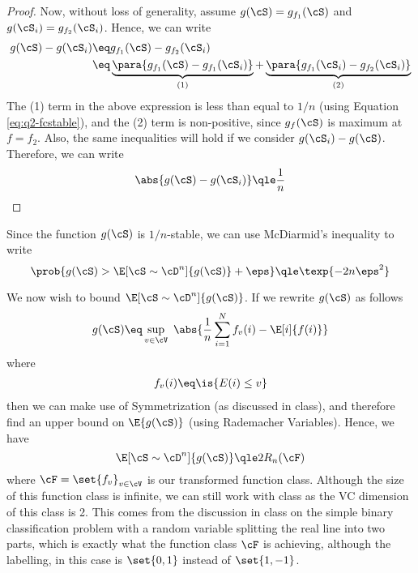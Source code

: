 \documentclass[a4paper,10pt]{article}
\begin{document}
\begin{question}
\begin{claim}
\begin{proof}
			Now, without loss of generality, assume $g(\cS) = g_{f_1}(\cS)$ and $g(\cS_i) = g_{f_2}(\cS_i)$. Hence, we can write
			\begin{align*}
				g(\cS) - g(\cS_i)	&\eq	g_{f_1}(\cS) - g_{f_2}(\cS_i) \\
				&\eq	\underbrace{\para{g_{f_1}(\cS) - g_{f_1}(\cS_i)}}_{(1)} + \underbrace{\para{g_{f_1}(\cS_i) - g_{f_2}(\cS_i)}}_{(2)}
			\end{align*}
			The (1) term in the above expression is less than equal to $1 / n$ (using Equation \ref{eq:q2-fcstable}), and the (2) term is non-positive, since $g_f(\cS)$ is maximum at $f = f_2$. Also, the same inequalities will hold if we consider $g(\cS_i) - g(\cS)$. Therefore, we can write
			\begin{equation}
				\abs{g(\cS) - g(\cS_i)}	\qle	\frac{1}{n}
				\label{eq:q2-cstable}
			\end{equation}

		\end{proof}
	\end{claim}

	Since the function $g(\cS)$ is $1 / n$-stable, we can use McDiarmid's inequality to write
	\begin{equation}
		\prob{g(\cS) > \E[\cS \sim \cD^n]{g(\cS)} + \eps}	\qle	\texp{- 2 n \eps^2}
		\label{eq:q2-mcdiarmid}
	\end{equation}

	We now wish to bound $\E[\cS \sim \cD^n]{g(\cS)}$. If we rewrite $g(\cS)$ as follows
	\begin{align*}
		g(\cS)	\eq	\sup_{v \in \cV}\ \abs{\frac{1}{n} \sum_{i = 1}^N f_v(i) - \E[i]{f(i)}}
	\end{align*}
	where
	\begin{align*}
		f_v(i)	\eq	\is{E(i) \le v}
	\end{align*}
	then we can make use of Symmetrization (as discussed in class), and therefore find an upper bound on $\E{g(\cS)}$ (using Rademacher Variables). Hence, we have
	\begin{equation}
		\E[\cS \sim \cD^n]{g(\cS)}	\qle	2 R_n(\cF)
		\label{eq:q2-rademacher}
	\end{equation}
	where $\cF = \set{f_v}_{v \in \cV}$ is our transformed function class. Although the size of this function class is infinite, we can still work with class as the VC dimension of this class is 2. This comes from the discussion in class on the simple binary classification problem with a random variable splitting the real line into two parts, which is exactly what the function class $\cF$ is achieving, although the labelling, in this case is $\set{0, 1}$ instead of $\set{1, -1}$.


\end{question}
\end{document}
